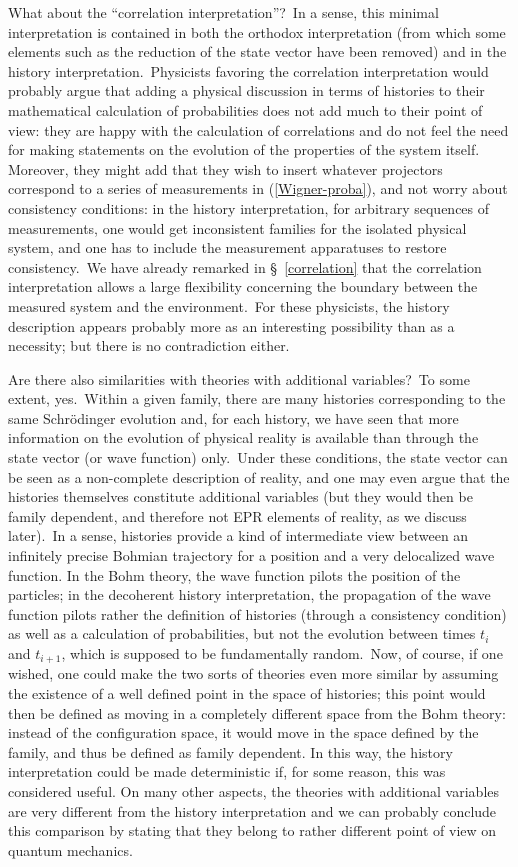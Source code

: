 \documentclass[12pt,onecolumn]{article}%
\begin{document}
What about the ``correlation interpretation''?\ In a sense, this minimal
interpretation is contained in both the orthodox interpretation (from which
some elements such as the reduction of the state vector have been removed) and
in the history interpretation.\ Physicists favoring the correlation
interpretation would probably argue that adding a physical discussion in terms
of histories to their mathematical calculation of probabilities does not add
much to their point of view: they are happy with the calculation of
correlations and do not feel the need for making statements on the evolution
of the properties of the system itself. Moreover, they might add that they
wish to insert whatever projectors correspond to a series of measurements in
(\ref{Wigner-proba}), and not worry about consistency conditions: in the
history interpretation, for arbitrary sequences of measurements, one would get
inconsistent families for the isolated physical system, and one has to include
the measurement apparatuses to restore consistency.\ We have already remarked
in \S \ \ref{correlation} that the correlation interpretation allows a large
flexibility concerning the boundary between the measured system and the
environment.\ For these physicists, the history description appears probably
more as an interesting possibility than as a necessity; but there is no
contradiction either.

Are there also similarities with theories with additional variables?\ To some
extent, yes.\ Within a given family, there are many histories corresponding to
the same Schr\"{o}dinger evolution and, for each history, we have seen that
more information on the evolution of physical reality is available than
through the state vector (or wave function) only.\ Under these conditions, the
state vector can be seen as a non-complete description of reality, and one may
even argue that the histories themselves constitute additional variables (but
they would then be family dependent, and therefore not EPR elements of
reality, as we discuss later).\ In a sense, histories provide a kind of
intermediate view between an infinitely precise Bohmian trajectory for a
position and a very delocalized wave function. In the Bohm theory, the wave
function pilots the position of the particles; in the decoherent history
interpretation, the propagation of the wave function pilots rather the
definition of histories (through a consistency condition) as well as a
calculation of probabilities, but not the evolution between times $t_{i}$ and
$t_{i+1}$, which is supposed to be fundamentally random.\ Now, of course, if
one wished, one could make the two sorts of theories even more similar by
assuming the existence of a well defined point in the space of histories; this
point would then be defined as moving in a completely different space from the
Bohm theory: instead of the configuration space, it would move in the space
defined by the family, and thus be defined as family dependent. In this way,
the history interpretation could be made deterministic if, for some reason,
this was considered useful. On many other aspects, the theories with
additional variables are very different from the history interpretation and we
can probably conclude this comparison by stating that they belong to rather
different point of view on quantum mechanics.
\end{document}
